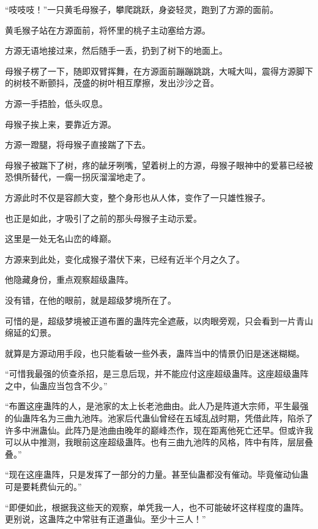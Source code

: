 
\begin{this_body}



“吱吱吱！”一只黄毛母猴子，攀爬跳跃，身姿轻灵，跑到了方源的面前。

黄毛猴子站在方源面前，将怀里的桃子主动塞给方源。

方源无语地接过来，然后随手一丢，扔到了树下的地面上。

母猴子楞了一下，随即双臂挥舞，在方源面前蹦蹦跳跳，大喊大叫，震得方源脚下的树枝不断颤抖，茂盛的树叶相互摩擦，发出沙沙之音。

方源一手捂脸，低头叹息。

母猴子挨上来，要靠近方源。

方源一蹬腿，将母猴子直接踹了下去。

母猴子被踹下了树，疼的龇牙咧嘴，望着树上的方源，母猴子眼神中的爱慕已经被恐惧所替代，一瘸一拐灰溜溜地走了。

方源此时不仅是容颜大变，整个身形也从人体，变作了一只雄性猴子。

也正是如此，才吸引了之前的那头母猴子主动示爱。

这里是一处无名山峦的峰巅。

方源来到此处，变化成猴子潜伏下来，已经有近半个月之久了。

他隐藏身份，重点观察超级蛊阵。

没有错，在他的眼前，就是超级梦境所在了。

可惜的是，超级梦境被正道布置的蛊阵完全遮蔽，以肉眼旁观，只会看到一片青山绵延的幻景。

就算是方源动用手段，也只能看破一些外表，蛊阵当中的情景仍旧是迷迷糊糊。

“可惜我最强的侦查杀招，是三息后现，并不能应付这座超级蛊阵。这座超级蛊阵之中，仙蛊应当包含不少。”

“布置这座蛊阵的人，是池家的太上长老池曲由。此人乃是阵道大宗师，平生最强的仙蛊阵名为三曲九池阵。池家后代蛊仙曾经在五域乱战时期，凭借此阵，陷杀了许多中洲蛊仙。此阵乃是池曲由晚年的巅峰杰作，现在距离他死亡还早。但或许我可以从中推测，我眼前这座超级蛊阵。也有三曲九池阵的风格，阵中有阵，层层叠叠。”

“现在这座蛊阵，只是发挥了一部分的力量。甚至仙蛊都没有催动。毕竟催动仙蛊可是要耗费仙元的。”

“即便如此，根据我这些天的观察，单凭我一人，也不可能破坏这样程度的蛊阵。更别说，这蛊阵之中常驻有正道蛊仙。至少十三人！”


\end{this_body}
